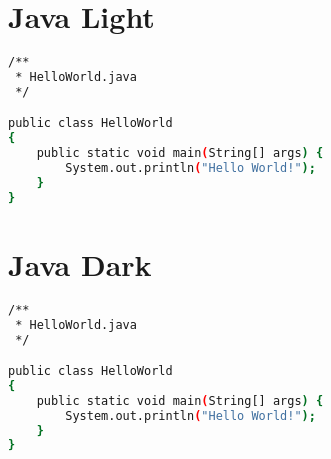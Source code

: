 \section{Java Light}

\begin{lstlisting}[language=bash, style=customStyleJavaLight, caption=Snippet title]
/**
 * HelloWorld.java
 */

public class HelloWorld
{
	public static void main(String[] args) {
		System.out.println("Hello World!");
	}
}
\end{lstlisting}

\section{Java Dark}

\begin{lstlisting}[language=bash, style=customStyleJavaDark, caption=Snippet title]
/**
 * HelloWorld.java
 */

public class HelloWorld
{
	public static void main(String[] args) {
		System.out.println("Hello World!");
	}
}
\end{lstlisting}

